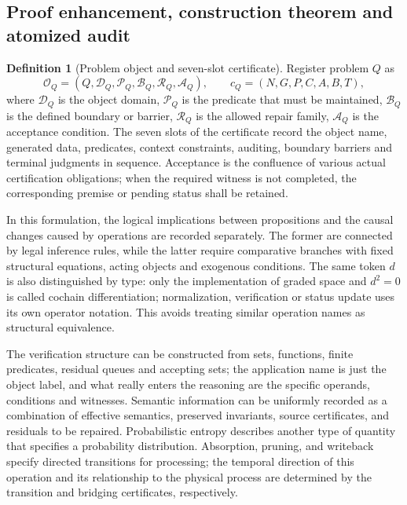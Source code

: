 \documentclass[11pt,a4paper]{article}
\theoremstyle{plain}
\theoremstyle{definition}
\newtheorem{definition}[theorem]{Definition}
\theoremstyle{remark}
\begin{document}
\begin{CJK*}
\subsection { Proof enhancement, construction theorem and atomized audit }

\begin{definition}
[Problem object and seven-slot certificate]Register problem $Q$ as \[
 \mathcal O_Q=(Q,\mathcal D_Q,\mathcal P_Q,\mathcal B_Q,
              \mathcal R_Q,\mathcal A_Q),\qquad
 c_Q=(N,G,P,C,A,B,T),
\] where $\mathcal D_Q$ is the object domain, $\mathcal P_Q$ is the predicate that must be maintained, $\mathcal B_Q$ is the defined boundary or barrier, $\mathcal R_Q$ is the allowed repair family, $\mathcal A_Q$ is the acceptance condition. The seven slots of the certificate record the object name, generated data, predicates, context constraints, auditing, boundary barriers and terminal judgments in sequence. Acceptance is the confluence of various actual certification obligations; when the required witness is not completed, the corresponding premise or pending status shall be retained.\end{definition}


In this formulation, the logical implications between propositions and the causal changes caused by operations are recorded separately. The former are connected by legal inference rules, while the latter require comparative branches with fixed structural equations, acting objects and exogenous conditions. The same token $d$ is also distinguished by type: only the implementation of graded space and $d^2=0$ is called cochain differentiation; normalization, verification or status update uses its own operator notation. This avoids treating similar operation names as structural equivalence.

The verification structure can be constructed from sets, functions, finite predicates, residual queues and accepting sets; the application name is just the object label, and what really enters the reasoning are the specific operands, conditions and witnesses. Semantic information can be uniformly recorded as a combination of effective semantics, preserved invariants, source certificates, and residuals to be repaired. Probabilistic entropy describes another type of quantity that specifies a probability distribution. Absorption, pruning, and writeback specify directed transitions for processing; the temporal direction of this operation and its relationship to the physical process are determined by the transition and bridging certificates, respectively.


\end{CJK*}
\end{document}

